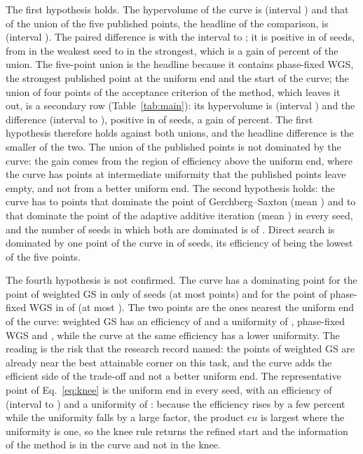 The first hypothesis holds. The hypervolume of the curve is \hvFront{} (interval \hvFrontCi) and that of the union of the five published points, the headline of the comparison, is \hvFivePub{} (interval \hvFivePubCi). The paired difference is \hvFiveDiff{} with the interval \hvFiveLo{} to \hvFiveHi{}; it is positive in \hvFiveGe{} of \nSeeds{} seeds, from \hvFiveMin{} in the weakest seed to \hvFiveMax{} in the strongest, which is a gain of \hvFiveRatioPct{} percent of the union. The five-point union is the headline because it contains phase-fixed WGS, the strongest published point at the uniform end and the start of the curve; the union of four points of the acceptance criterion of the method, which leaves it out, is a secondary row (Table~\ref{tab:main}): its hypervolume is \hvPub{} (interval \hvPubCi) and the difference \hvDiff{} (interval \hvDiffLo{} to \hvDiffHi), positive in \hvGeCount{} of \nSeeds{} seeds, a gain of \hvRatioPct{} percent. The first hypothesis therefore holds against both unions, and the headline difference is the smaller of the two. The union of the published points is not dominated by the curve: the gain comes from the region of efficiency above the uniform end, where the curve has points at intermediate uniformity that the published points leave empty, and not from a better uniform end.
The second hypothesis holds: the curve has \domGSMin{} to \domGSMax{} points that dominate the point of Gerchberg--Saxton (mean \domGSMean) and \domGAAMin{} to \domGAAMax{} that dominate the point of the adaptive additive iteration (mean \domGAAMean) in every seed, and
the number of seeds in which both are dominated is \domBothSeeds{} of \nSeeds{}. Direct search is dominated by one point of the curve in \domDSSeeds{} of \nSeeds{} seeds, its efficiency of \ptDSE{} being the lowest of the five points.


The fourth hypothesis is not confirmed. The curve has a dominating point for the point of weighted GS in only \domGSWSeeds{} of \nSeeds{} seeds (at most \domGSWMax{} points) and for the point of phase-fixed WGS in \domPFSeeds{} of \nSeeds{} (at most \domPFMax). The two points are the ones nearest the uniform end of the curve: weighted GS has an efficiency of \ptGSWE{} and a uniformity of \ptGSWU{}, phase-fixed WGS \ptPFE{} and \ptPFU{}, while the curve at the same efficiency has a lower uniformity. The reading is the risk that the research record named: the points of weighted GS are already near the best attainable corner on this task, and the curve adds the efficient side of the trade-off and not a better uniform end.
The representative point of Eq.~\ref{eq:knee} is the uniform end in every seed, with an efficiency of \kneeE{} (interval \kneeELo{} to \kneeEHi) and a uniformity of \kneeU{}: because the efficiency rises by a few percent while the uniformity falls by a large factor, the product $eu$ is largest where the uniformity is one, so the knee rule returns the refined start and the information of the method is in the curve and not in the knee.

